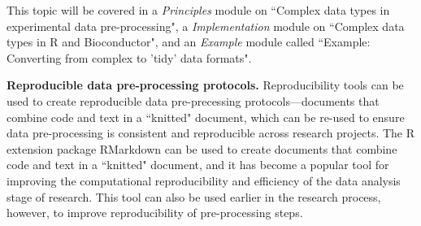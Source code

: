 \documentclass[pdftex,english,11pt,parskip=half]{scrartcl}
\begin{document}
This topic will be covered in a \textit{Principles} module on ``Complex data types in
experimental data pre-processing", a \textit{Implementation} module on ``Complex
data types in R and Bioconductor", and an \textit{Example} module called
``Example: Converting from complex to 'tidy' data formats".

\textbf{Reproducible data pre-processing protocols.} Reproducibility tools can be used to create reproducible data pre-precessing protocols---documents that combine code and text in a ``knitted" document, which can be re-used to ensure data pre-processing is consistent and reproducible across research projects. The R extension package RMarkdown can be used to create documents that combine code and text in a 
``knitted" document, and it has become a popular tool 
for improving the computational reproducibility and 
efficiency of the data analysis stage of research. This tool can also be used earlier in the research process, however, to improve reproducibility of pre-processing steps. 
\end{document}
